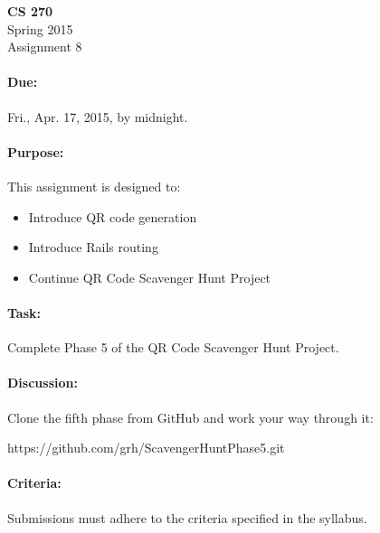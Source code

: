 \documentclass[11pt]{article}
\begin{document}
    \begin{center}

        \large\textbf{CS 270} \\
        Spring 2015 \\
        Assignment 8 \\

    \end{center}

    \paragraph{Due:} Fri., Apr. 17, 2015, by midnight.

    \paragraph{Purpose:} This assignment is designed to:

        \begin{itemize}

            \item Introduce QR code generation

            \item Introduce Rails routing

            \item Continue QR Code Scavenger Hunt Project

        \end{itemize}

    \paragraph{Task:} Complete Phase 5 of the QR Code Scavenger Hunt
    Project.
    
    \paragraph{Discussion:} Clone the fifth phase from
    GitHub and work your way through it:

    \begin{center}

        https://github.com/grh/ScavengerHuntPhase5.git

    \end{center}

    \paragraph{Criteria:} Submissions must adhere to the criteria
    specified in the syllabus.
\end{document}
